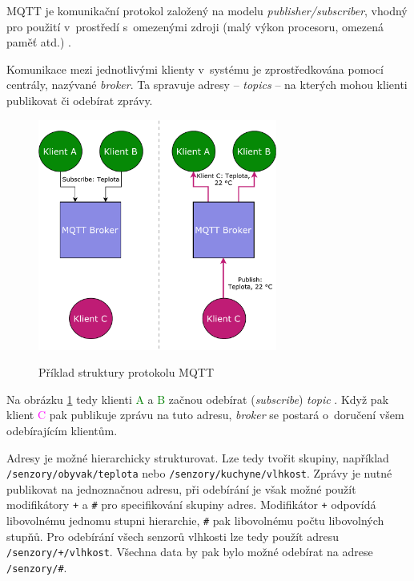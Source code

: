 MQTT je komunikační protokol založený na modelu \textit{publisher/subscriber}, vhod\-ný pro použití v~prostředí s~omezenými zdroji (malý výkon procesoru, omezená paměť atd.) \cite{mqtt_valerie}.

Komunikace mezi jednotlivými klienty v~systému je zprostředkována pomocí centrály, nazývané \textit{broker}. Ta spravuje adresy -- \textit{topics} -- na kterých mohou klienti publikovat či odebírat zprávy.

\begin{figure}[h!]
    \centering
    \includegraphics[width=0.7\textwidth]{images/basic_mqtt.pdf}
    \label{fig:basic_mqtt}
    \caption[Příklad struktury protokolu MQTT]{Příklad struktury protokolu MQTT \cite{mqtt_eclipse}}
\end{figure}

Na obrázku \ref{fig:basic_mqtt} tedy klienti \textcolor{green}{A} a \textcolor{green}{B} začnou odebírat (\textit{subscribe}) \textit{topic} . Když pak klient \textcolor{magenta}{C} pak publikuje zprávu na tuto adresu, \textcolor{blue2}{\textit{broker}} se postará o~doručení všem odebírajícím klientům.

Adresy je možné hierarchicky strukturovat. Lze tedy tvořit skupiny, například \verb|/senzory/obyvak/teplota| nebo \verb|/senzory/kuchyne/vlhkost|. Zprávy je nutné publikovat na jednoznačnou adresu, při odebírání je však možné použít modifikátory \verb|+| a \verb|#| pro specifikování skupiny adres. Modifikátor \verb|+| odpovídá libovolnému jednomu stupni hierarchie, \verb|#| pak libovolnému počtu libovolných stupňů. Pro odebírání všech senzorů vlhkosti lze tedy použít adresu \verb|/senzory/+/vlhkost|. Všechna data by pak bylo možné odebírat na adrese \verb|/senzory/#|. \cite{mqtt_eclipse}

